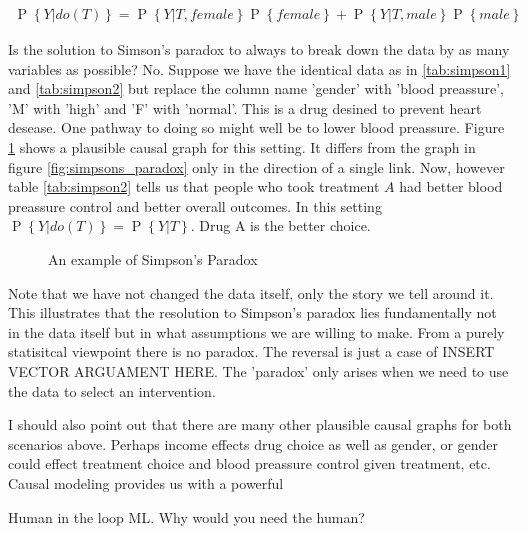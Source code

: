\documentclass[11pt,a4paper,oneside]{book}
\newcommand{\eqn}[1]{\begin{align}#1\end{align}}
\renewcommand{\P}[1]{\operatorname{P}\left\{#1\right\}}
\theoremstyle{plain}
\theoremstyle{definition}
\begin{document}
\eqn{
\P{Y|do(T)} = \P{Y|T,female}\P{female}+ \P{Y|T,male}\P{male}
}

Is the solution to Simson's paradox to always to break down the data by as many variables as possible? No. Suppose we have the identical data as in \ref{tab:simpson1} and \ref{tab:simpson2} but replace the column name 'gender' with 'blood preassure', 'M' with 'high' and 'F' with 'normal'. This is a drug desined to prevent heart desease. One pathway to doing so might well be to lower blood preassure. Figure \ref{fig:simpsons_paradox2} shows a plausible causal graph for this setting. It differs from the graph in figure \ref{fig:simpsons_paradox} only in the direction of a single link. Now, however table \ref{tab:simpson2} tells us that people who took treatment $A$ had better blood preassure control and better overall outcomes. In this setting $\P{Y|do(T)} = \P{Y|T}$. Drug A is the better choice. 

\begin{figure}[h]
\caption{An example of Simpson's Paradox}
\label{fig:simpsons_paradox2}
\centering
{}
\end{figure}

Note that we have not changed the data itself, only the story we tell around it. This illustrates that the resolution to Simpson's paradox lies fundamentally not in the data itself but in what assumptions we are willing to make. From a purely statisitcal viewpoint there is no paradox. The reversal is just a case of INSERT VECTOR ARGUAMENT HERE. The 'paradox' only arises when we need to use the data to select an intervention. 

I should also point out that there are many other plausible causal graphs for both scenarios above. Perhaps income effects drug choice as well as gender, or gender could effect treatment choice and blood preassure control given treatment, etc. Causal modeling provides us with a powerful 



Human in the loop ML. Why would you need the human?

\end{document}
